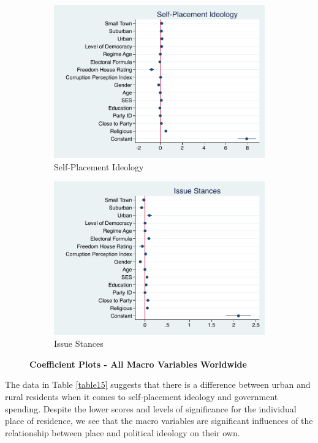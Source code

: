 \documentclass[12pt, titlepage]{article}
\newcommand\tb{\textbf}
\begin{document}
\begin{figure}[H]
	\centering
	\begin{subfigure}[b]{0.475\textwidth}   
		\centering 
		\includegraphics[width=\textwidth]{IdeoMacroCoef}
		\caption{Self-Placement Ideology}
	\end{subfigure}
	\hfill
	\begin{subfigure}[b]{0.475\textwidth}
		\centering 
		\includegraphics[width=\textwidth]{LibMacroCoef}
		\caption{Issue Stances}
	\end{subfigure}
	\caption{\tb{Coefficient Plots - All Macro Variables Worldwide}}
	\label{GlobalMacroCoef}
\end{figure}

The data in Table \ref{table15} suggests that there is a difference between urban and rural residents when it comes to self-placement ideology and government spending. Despite the lower scores and levels of significance for the individual place of residence, we see that the macro variables are significant influences of the relationship between place and political ideology on their own. 
\end{document}
